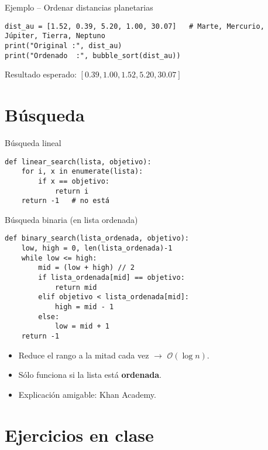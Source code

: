 \documentclass[10pt]{beamer}
\begin{document}
\begin{frame}[fragile]{Ejemplo -- Ordenar distancias planetarias}
\begin{verbatim}
dist_au = [1.52, 0.39, 5.20, 1.00, 30.07]   # Marte, Mercurio, Júpiter, Tierra, Neptuno
print("Original :", dist_au)
print("Ordenado  :", bubble_sort(dist_au))
\end{verbatim}
\pause
Resultado esperado: \([0.39, 1.00, 1.52, 5.20, 30.07]\)
\end{frame}

\section{Búsqueda}
\begin{frame}[fragile]{Búsqueda lineal}
\begin{verbatim}
def linear_search(lista, objetivo):
    for i, x in enumerate(lista):
        if x == objetivo:
            return i
    return -1   # no está
\end{verbatim}
\end{frame}

\begin{frame}[fragile]{Búsqueda binaria (en lista ordenada)}
\begin{verbatim}
def binary_search(lista_ordenada, objetivo):
    low, high = 0, len(lista_ordenada)-1
    while low <= high:
        mid = (low + high) // 2
        if lista_ordenada[mid] == objetivo:
            return mid
        elif objetivo < lista_ordenada[mid]:
            high = mid - 1
        else:
            low = mid + 1
    return -1
\end{verbatim}
\begin{itemize}
  \item Reduce el rango a la mitad cada vez $\longrightarrow$ \(\mathcal{O}(\log n)\).  
  \item Sólo funciona si la lista está \textbf{ordenada}.  
  \item Explicación amigable: Khan Academy.
\end{itemize}
\end{frame}

\section{Ejercicios en clase}
\end{document}
